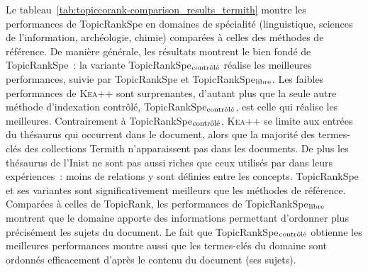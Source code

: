   Le tableau~\ref{tab:topiccorank-comparison_results_termith} montre les
  performances de TopicRankSpe en domaines de spécialité (linguistique,
  sciences de l'information, archéologie, chimie) comparées à celles des
  méthodes de référence. De manière générale, les résultats montrent le
  bien fondé de TopicRankSpe~: la variante
  TopicRankSpe$_\textnormal{contrôlé}$ réalise les meilleures performances,
  suivie par TopicRankSpe et TopicRankSpe$_\textnormal{libre}$. Les faibles
  performances de \textsc{Kea++} sont surprenantes, d'autant plus que la
  seule autre méthode d'indexation contrôlé, TopicRankSpe$_\textnormal{contrôlé}$,
  est celle qui réalise les meilleures. Contrairement à
  TopicRankSpe$_\textnormal{contrôlé}$, \textsc{Kea++} se limite aux entrées
  du thésaurus qui occurrent dans le document, alors que la majorité des
  termes-clés des collections Termith n'apparaissent pas dans les
  documents. De plus les thésaurus de l'Inist ne sont pas aussi riches que
  ceux utilisés par  dans leurs expériences~:
  moins de relations y sont définies entre les concepts. TopicRankSpe et
  ses variantes sont significativement meilleurs que les méthodes de
  référence. Comparées à celles de TopicRank, les performances de
  TopicRankSpe$_\textnormal{libre}$ montrent que le domaine apporte des
  informations permettant d'ordonner plus précisément les sujets du
  document. Le fait que TopicRankSpe$_\textnormal{contrôlé}$ obtienne les
  meilleures performances montre aussi que les termes-clés du domaine sont
  ordonnés efficacement d'après le contenu du document (ses sujets).
